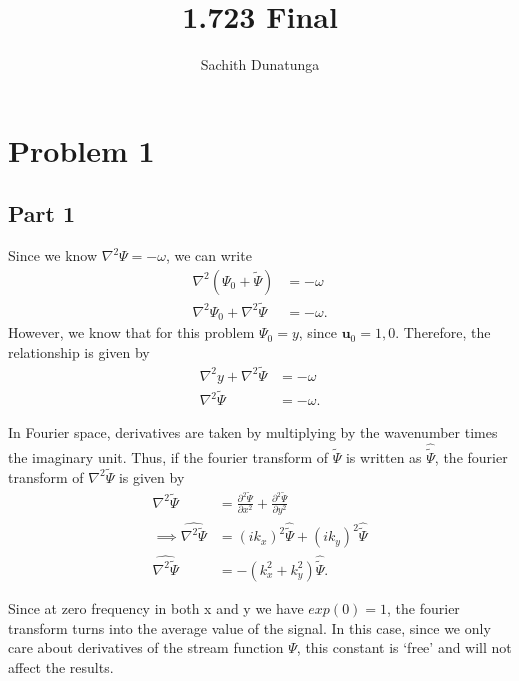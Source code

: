 \documentclass{article}
\title{1.723 Final}
\author{Sachith  Dunatunga}
\begin{document}
\newcommand{\deriv}[2]{\frac{\partial #1}{ \partial #2}}
\newcommand{\nderiv}[3]{\frac{\partial^{#3} #1}{ \partial #2^{#3}}}
\newcommand{\dx}[1]{\deriv{#1}{x}}
\newcommand{\taylorexpf}[3]{#1_{#2} + \left(#3 \right) \dx{#1}\biggr\rvert_{#2} + \frac{1}{2}\left(#3 \right)^2 \nderiv{#1}{x}{2}\biggr\rvert_{#2} + \frac{1}{6}\left(#3 \right)^3\nderiv{#1}{x}{3}\biggr\rvert_{#2} + \frac{1}{24}\left(#3 \right)^4\nderiv{#1}{x}{4}\biggr\rvert_{#2} + O(h^5)}
\maketitle

\section{Problem 1}
\subsection{Part 1}
Since we know $\nabla^2 \Psi = - \omega$, we can write
\begin{align}
    \nabla^2 (\Psi_0 + \tilde{\Psi}) &= -\omega \\
    \nabla^2 \Psi_0 + \nabla^2 \tilde{\Psi} &= -\omega.
\end{align}
However, we know that for this problem $\Psi_0 = y$, since $\mathbf{u}_0 = {1, 0}$.
Therefore, the relationship is given by
\begin{align}
    \nabla^2 y + \nabla^2 \tilde{\Psi} &= -\omega \\
    \nabla^2 \tilde{\Psi} &= -\omega.
\end{align}

In Fourier space, derivatives are taken by multiplying by the wavenumber times the imaginary unit.
Thus, if the fourier transform of $\tilde{\Psi}$ is written as $\hat{\tilde{\Psi}}$, the fourier transform of $\nabla^2 \tilde{\Psi}$ is given by
\begin{align}
    \nabla^2 \tilde{\Psi} &= \nderiv{\tilde{\Psi}}{x}{2} + \nderiv{\tilde{\Psi}}{y}{2} \\
\implies \widehat{\nabla^2 \tilde{\Psi}} &= (ik_x)^2 \hat{\tilde{\Psi}} + (ik_y)^2 \hat{\tilde{\Psi}}\\
    \widehat{\nabla^2 \tilde{\Psi}} &= -(k^2_x + k^2_y) \hat{\tilde{\Psi}}.
\end{align}

Since at zero frequency in both x and y we have $exp(0) = 1$, the fourier transform turns into the average value of the signal.
In this case, since we only care about derivatives of the stream function $\Psi$, this constant is `free' and will not affect the results.
\end{document}
